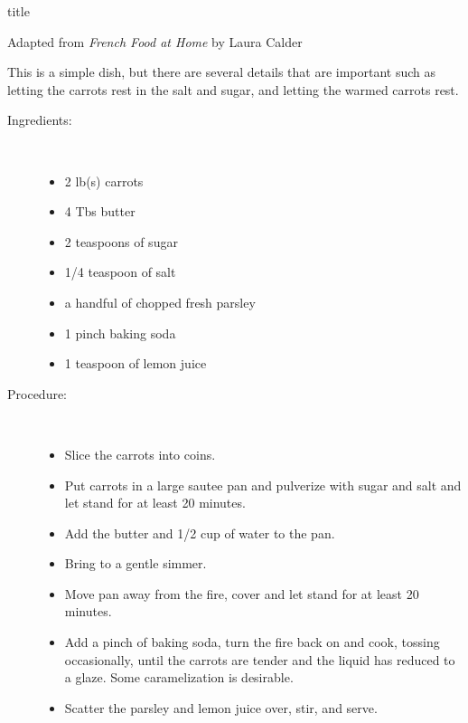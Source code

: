 \documentclass[11pt,letterpaper]{article}
\begin{document}
 {title}

\begin{flushright}
Adapted from {\it French Food at Home} by Laura Calder
\end{flushright}

This is a simple dish, but there are several details that are important such as letting the carrots rest in the salt and sugar, and letting the warmed carrots rest.

\begin{description}

\item[Ingredients:]\ \\
	\begin{itemize}
	\item 2 lb(s) carrots
	\item 4 Tbs butter
	\item 2 teaspoons of sugar
	\item 1/4 teaspoon of salt
	\item a handful of chopped fresh parsley
	\item 1 pinch baking soda
	\item 1 teaspoon of lemon juice
	\end{itemize}

\item[Procedure:]\ \\
	\begin{itemize}
	\item Slice the carrots into coins. 
	\item Put carrots in a large sautee pan and pulverize with sugar and salt and let stand for at least 20 minutes.
	\item Add the butter and 1/2 cup of water to the pan. 
	\item Bring to a gentle simmer.
	\item Move pan away from the fire, cover and let stand for at least 20 minutes.
	\item Add a pinch of baking soda, turn the fire back on and cook, tossing occasionally, until the carrots are tender
	         and the liquid has reduced to a glaze. Some caramelization is desirable. 
	\item Scatter the parsley and lemon juice over, stir, and serve.
	\end{itemize}

\end{description}
\end{document}
